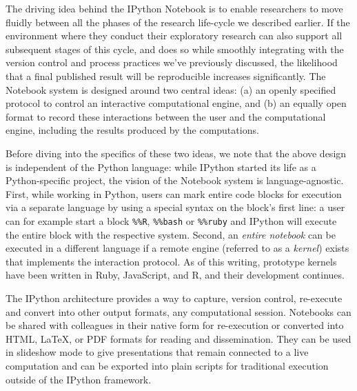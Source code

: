 \documentclass[ChapterTOCs,krantz2]{krantz} %
\begin{document}
The driving idea behind the IPython Notebook is to enable researchers to move
fluidly between all the phases of the research life-cycle we described earlier.
If the environment where they conduct their exploratory research can also
support all subsequent stages of this cycle, and does so while smoothly
integrating with the version control and process practices we've previously
discussed, the likelihood that a final published result will be reproducible
increases significantly.  The Notebook system is designed around two central
ideas: (a) an openly specified protocol to control an interactive computational
engine, and (b) an equally open format to record these interactions between the
user and the computational engine, including the results produced by the
computations.

Before diving into the specifics of these two ideas, we note that the above
design is independent of the Python language: while IPython started its life as
a Python-specific project, the vision of the Notebook system is
language-agnostic.  First, while working in Python, users can mark entire code
blocks for execution via a separate language by using a special syntax on the
block's first line: a user can for example start a block \texttt{\%\%R},
\texttt{\%\%bash} or \texttt{\%\%ruby} and IPython will execute the entire
block with the respective system.  Second, an \emph{entire notebook} can be
executed in a different language if a remote engine (referred to as a
\emph{kernel}) exists that implements the interaction protocol.  As of this
writing, prototype kernels have been written in Ruby, JavaScript, and R, and
their development continues.

The IPython architecture provides a way to capture, version control, re-execute
and convert into other output formats, any computational session.  Notebooks
can be shared with colleagues in their native form for re-execution or
converted into HTML, \LaTeX, or PDF formats for reading and dissemination.  They
can be used in slideshow mode to give presentations that remain connected to a
live computation and can be exported into plain scripts for traditional
execution outside of the IPython framework.
\end{document}
